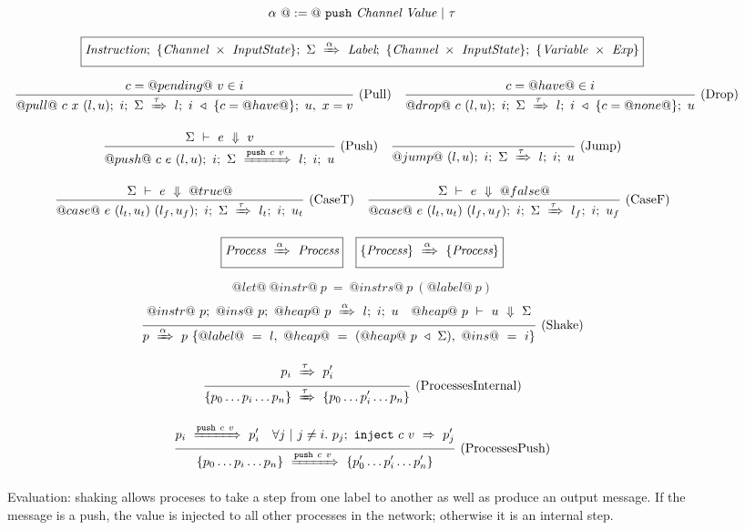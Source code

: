 \begin{figure}
$$
\alpha~@:=@~ \Push~\Chan~\Value ~|~ \tau
$$

$$
  \boxed{
    \ProcBlockShake
      {\Instr}{\MapType{\Chan}{\InputState}}{\Sigma}
      {\alpha}
      {\Label}{\MapType{\Chan}{\InputState}}{\MapType{\Var}{\Exp}}
  }
$$


$$
\ruleIN{
  c=@pending@~v \in i
}{
  \ProcBlockShake{@pull@~c~x~(l,u)}{i}{\Sigma}{\tau}{l}{\HeapUpdateOne{c}{@have@}{i}}{u,~x = v}
}{Pull}
\ruleIN{
  c=@have@ \in i
}{
  \ProcBlockShake{@drop@~c~(l,u)}{i}{\Sigma}{\tau}{l}{\HeapUpdateOne{c}{@none@}{i}}{u}
}{Drop}
$$

$$
\ruleIN{
  \ExpEval{\Sigma}{e}{v}
}{
  \ProcBlockShake{@push@~c~e~(l,u)}{i}{\Sigma}{\Push~c~v}{l}{i}{u}
}{Push}
\ruleIN{
}{
  \ProcBlockShake{@jump@~(l,u)}{i}{\Sigma}{\tau}{l}{i}{u}
}{Jump}
$$

$$
\ruleIN{
  \ExpEval{\Sigma}{e}{@true@}
}{
  \ProcBlockShake{@case@~e~(l_t,u_t)~(l_f,u_f)}{i}{\Sigma}{\tau}{l_t}{i}{u_t}
}{CaseT}
\ruleIN{
  \ExpEval{\Sigma}{e}{@false@}
}{
  \ProcBlockShake{@case@~e~(l_t,u_t)~(l_f,u_f)}{i}{\Sigma}{\tau}{l_f}{i}{u_f}
}{CaseF}
$$

$$
  \boxed{\ProcShake{\Proc}{\alpha}{\Proc}}
  \quad
  \boxed{\ProcsShake{\sgl{\Proc}}{\alpha}{\sgl{\Proc}}}
$$

$$
@let@~@instr@~p~=~@instrs@~p~(@label@~p)
$$
$$
\ruleIN{
  \ProcBlockShake
    {@instr@~p} {@ins@~p}{@heap@~p}
    {\alpha}
    {l}{i}{u}
  \quad
    \ExpEval{@heap@~p}{u}{\Sigma}
}{
  \ProcShake{p}{\alpha}{p~\sgl{@label@~=~l,~@heap@~=~(\HeapUpdates{\Sigma}{@heap@~p}),~@ins@~=~i}}
}{Shake}
$$




$$
\ruleIN{
  \ProcShake{p_i}{\tau}{p'_i}
}{
  \ProcsShake{
    \sgl{p_0 \ldots p_i \ldots p_n}
  }{\tau}{
    \sgl{p_0 \ldots p'_i \ldots p_n}
  }
}{ProcessesInternal}
$$

$$
\ruleIN{
  \ProcShake{p_i}{\Push~c~v}{p'_i}
  \quad
  \forall j~|~j \neq i.~
  \ProcInject{p_j}{c}{v}{p'_j}
}{
  \ProcsShake{
    \sgl{p_0 \ldots p_i \ldots p_n}
  }{\Push~c~v}{
    \sgl{p'_0 \ldots p'_i \ldots p'_n}
  }
}{ProcessesPush}
$$


\caption{Evaluation: shaking allows proceses to take a step from one label to another as well as produce an output message.
If the message is a push, the value is injected to all other processes in the network; otherwise it is an internal step.}
\label{fig:Process:Eval:Shake}
\end{figure}

